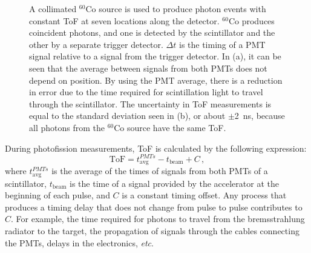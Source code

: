 \begin{figure}[h]
\caption{A collimated $^{60}$Co source is used to produce photon events with constant ToF at seven locations along the detector.
$^{60}$Co produces coincident photons, and one is detected by the scintillator and the other by a separate trigger detector.
 $\Delta t$ is the timing of a PMT signal relative to a signal from the trigger detector. 
 In (a), it can be seen that the average between signals from both PMTs does not depend on position.
By using the PMT average, there is a reduction in error due to the time required for scintillation light to travel through the scintillator.
The uncertainty in ToF measurements is equal to the standard deviation seen in (b), or about $\pm$2~ns, because all photons from the $^{60}$Co source have the same ToF.}
\label{fig:ConstPMTAvg}
\end{figure}

During photofission measurements, ToF is calculated by the following expression:
\begin{equation}
\label{eq:ToF}
\text{ToF} = t^{PMTs}_{\text{avg}} - t_{\text{beam}} + C \, ,
\end{equation}
where $t^{PMTs}_{\text{avg}}$ is the average of the times of signals from both PMTs of a scintillator, $t_{\text{beam}}$ is the time of a signal provided by the accelerator at the beginning of each pulse, and $C$ is a constant timing offset.
Any process that produces a timing delay that does not change from pulse to pulse contributes to $C$.
For example, the time required for photons to travel from the bremsstrahlung radiator to the target, the propagation of signals through the cables connecting the PMTs, delays in the electronics, {\em{etc}}.

